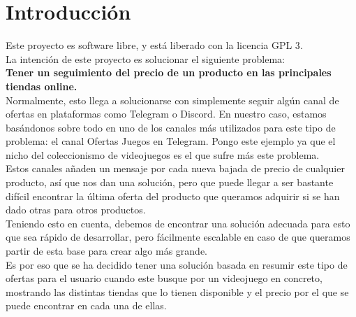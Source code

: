 \chapter{Introducción}

Este proyecto es software libre, y está liberado con la licencia GPL 3\cite{gplv3}.\\

La intención de este proyecto es solucionar el siguiente problema:\\

\textbf{Tener un seguimiento del precio de un producto en las principales tiendas online.}\\

Normalmente, esto llega a solucionarse con simplemente seguir algún canal de ofertas en plataformas como Telegram o Discord.
En nuestro caso, estamos basándonos sobre todo en uno de los canales más utilizados para este tipo de problema: el canal Ofertas Juegos en Telegram.
Pongo este ejemplo ya que el nicho del coleccionismo de videojuegos es el que sufre más este problema.\\

Estos canales añaden un mensaje por cada nueva bajada de precio de cualquier producto, así que nos dan una solución, pero que puede llegar a ser
bastante difícil encontrar la última oferta del producto que queramos adquirir si se han dado otras para otros productos.\\

Teniendo esto en cuenta, debemos de encontrar una solución adecuada para esto que sea rápido de desarrollar, pero fácilmente escalable en
caso de que queramos partir de esta base para crear algo más grande.\\

Es por eso que se ha decidido tener una solución basada en resumir este tipo de ofertas para el usuario cuando este busque por un videojuego en concreto, 
mostrando las distintas tiendas que lo tienen disponible y el precio por el que se puede encontrar en cada una de ellas.\\
